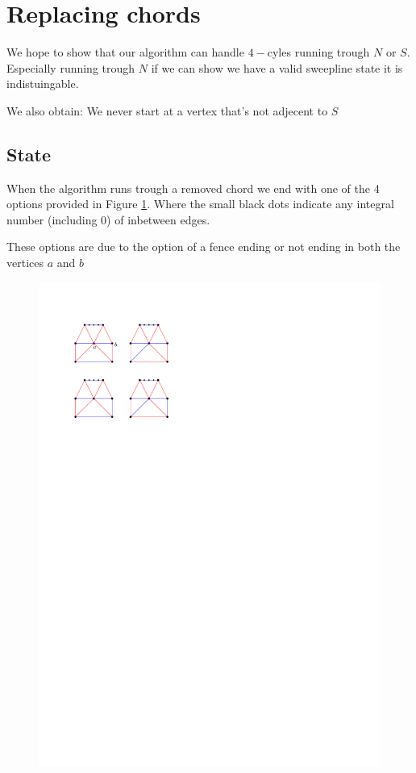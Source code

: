 
\section{Replacing chords}
We hope to show that our algorithm can handle $4-$cyles running trough $N$ or $S$. Especially running trough $N$ if we can show we have a valid sweepline state it is indistuingable.

We also obtain: We never start at a vertex that's not adjecent to $S$


\subsection{State}
When the algorithm runs trough a removed chord we end with one of the 4 options provided in Figure
\ref{fig:replace:options}. Where the small black dots indicate any integral number (including 0) of inbetween edges.

These options are due to the option of a fence ending or not ending in both the vertices $a$ and $b$

\begin{figure}[h]
  \centering
  \includegraphics[scale=1]{chordReplace/img/options}
  \caption{}
  \label{fig:replace:options}
\end{figure}


